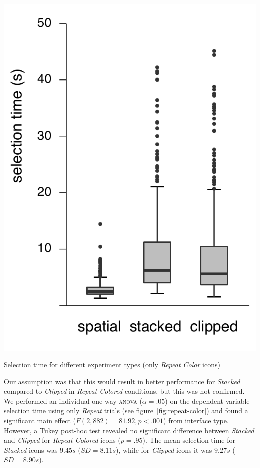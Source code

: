 \documentclass[nobib]{tufte-book} %
\begin{document}
\begin{marginfigure}
  \includegraphics[width=\linewidth]{repeat-color.pdf}
  \caption{Selection time for different experiment types (only \emph{Repeat Color} icons)}
  \label{fig:repeat-color}
\end{marginfigure}

Our assumption was that this would result in better performance for \emph{Stacked} compared to \emph{Clipped} in \emph{Repeat Colored} conditions, but this was not confirmed. We performed an individual one-way \textsc{anova} ($\alpha = .05$) on the dependent variable selection time using only \emph{Repeat} trials (see figure~\ref{fig:repeat-color}) and found a significant main effect ($F(2,882) = 81.92, p < .001$) from interface type.
However, a Tukey post-hoc test revealed no significant difference between \emph{Stacked} and \emph{Clipped} for \emph{Repeat Colored} icons ($p = .95$). The mean selection time for \emph{Stacked} icons was $9.45 s$ ($SD = 8.11 s$), while for \emph{Clipped} icons it was $9.27 s$ ($SD = 8.90 s$).
\end{document}
